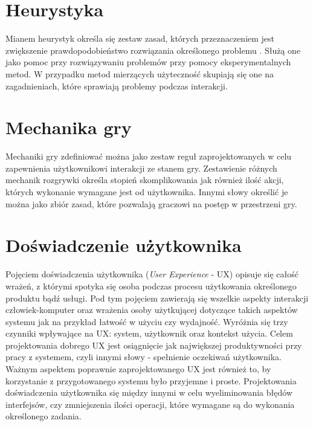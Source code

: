 \documentclass[a4paper,12pt,numbers=noenddot]{report}
\begin{document}
\section{Heurystyka}
Mianem heurystyk określa się zestaw zasad, których przeznaczeniem jest zwiększenie prawdopodobieństwo rozwiązania określonego problemu \cite{art_WithHeuristic}. Służą one jako pomoc przy rozwiązywaniu problemów przy pomocy eksperymentalnych metod. W przypadku metod mierzących użyteczność skupiają się one na zagadnieniach, które sprawiają problemy podczas interakcji\cite{art_Nielsen}\cite{art_evaluatingPlayabilityMG}. 

\section{Mechanika gry}
Mechaniki gry zdefiniować można jako zestaw reguł zaprojektowanych w celu zapewnienia użytkownikowi interakcji ze stanem gry. Zestawienie różnych mechanik rozgrywki określa stopień skomplikowania jak również ilość akcji, których wykonanie wymagane jest od użytkownika. Innymi słowy określić je można jako zbiór zasad, które pozwalają graczowi na postęp w przestrzeni gry. \cite{online_GameMechanics}

\section{Doświadczenie użytkownika}

Pojęciem doświadczenia użytkownika (\textit{User Experience} - UX) opisuje się całość wrażeń, z którymi spotyka się osoba podczas procesu użytkowania określonego produktu bądź usługi. Pod tym pojęciem zawierają się wszelkie aspekty interakcji człowiek-komputer oraz wrażenia osoby użytkującej dotyczące takich aspektów systemu jak na przykład łatwość w użyciu czy wydajność. Wyróżnia się trzy czynniki wpływające na UX: system, użytkownik oraz kontekst użycia. \cite{online_UXDef}
Celem projektowania dobrego UX jest osiągnięcie jak największej produktywności przy pracy z systemem, czyli innymi słowy - spełnienie oczekiwań użytkownika. Ważnym aspektem poprawnie zaprojektowanego UX jest również to, by korzystanie z przygotowanego systemu było przyjemne i proste. Projektowania doświadczenia użytkownika się między innymi w celu wyeliminowania błędów interfejsów, czy zmniejszenia ilości operacji, które wymagane są do wykonania określonego zadania.
\cite{art_UserExperience}
\end{document}
